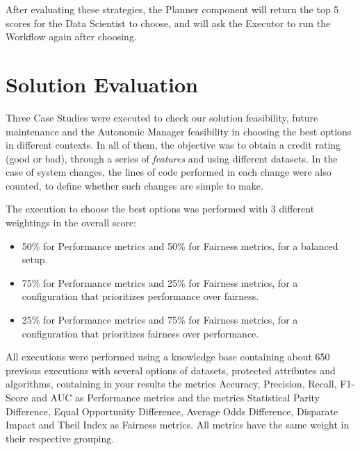\documentclass[sigconf]{acmart}
\begin{document}
After evaluating these strategies, the Planner component will return the top 5 scores for the Data Scientist to choose, and will ask the Executor to run the Workflow again after choosing.

\section{Solution Evaluation}

Three Case Studies were executed to check our solution feasibility, future maintenance and the Autonomic Manager feasibility in choosing the best options in different contexts. In all of them, the objective was to obtain a credit rating (good or bad), through a series of \textit{features} and using different datasets. In the case of system changes, the lines of code performed in each change were also counted, to define whether such changes are simple to make.

The execution to choose the best options was performed with 3 different weightings in the overall score:

\begin{itemize}
\item 50\% for Performance metrics and 50\% for Fairness metrics, for a balanced setup.
\item 75\% for Performance metrics and 25\% for Fairness metrics, for a configuration that prioritizes performance over fairness.
\item 25\% for Performance metrics and 75\% for Fairness metrics, for a configuration that prioritizes fairness over performance.
\end{itemize}

All executions were performed using a knowledge base containing about 650 previous executions with several options of datasets, protected attributes and algorithms, containing in your results the metrics Accuracy, Precision, Recall, F1-Score and AUC as Performance metrics and the metrics Statistical Parity Difference, Equal Opportunity Difference, Average Odds Difference, Disparate Impact and Theil Index as Fairness metrics. All metrics have the same weight in their respective grouping.
\end{document}
